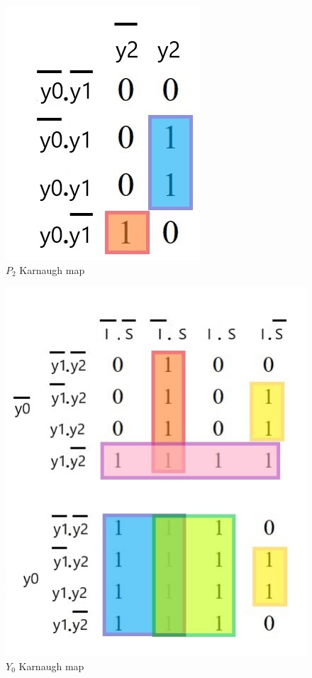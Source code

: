 \documentclass[../../e3_tp3_main.tex]{subfiles}
\begin{document}
\begin{figure}[H]
	\centering
	\includegraphics[scale=0.8]{figures/e3_tp3_ej1_moore_b2_kmap.jpg}
	\caption{$P_2$ Karnaugh map}
\end{figure}

\begin{figure}[H]
	\centering
	\includegraphics[scale=1]{figures/e3_tp3_ej1_moore_y0_kmap.jpg}
	\caption{$Y_0$ Karnaugh map}
\end{figure}
\end{document}
